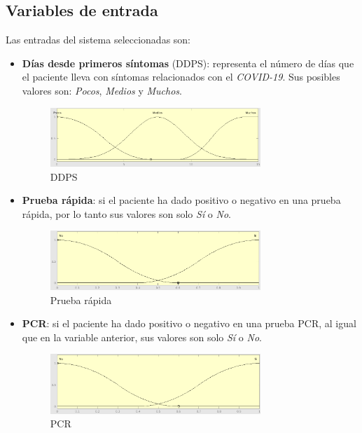 \documentclass[12pt,a4paper, xcolor=table]{article}
\begin{document}
\begin{center}
\subsection{Variables de entrada}

Las entradas del sistema seleccionadas son:

\begin{itemize}
  \item \textbf{Días desde primeros síntomas} (DDPS): representa el número de días que el paciente lleva con síntomas relacionados con el \textit{COVID-19}. Sus posibles valores son: \textit{Pocos}, \textit{Medios} y \textit{Muchos}.

  \begin{figure}[!h]
      \centering
      \includegraphics[width=300px]{img/dias_primeros_sintomas.png}
      \caption{DDPS}
  \end{figure}

  \item \textbf{Prueba rápida}: si el paciente ha dado positivo o negativo en una prueba rápida, por lo tanto sus valores son solo \textit{Sí} o \textit{No}.

  \begin{figure}[!h]
      \centering
      \includegraphics[width=300px]{img/prueba_rapida.png}
      \caption{Prueba rápida}
  \end{figure}

  \item \textbf{PCR}: si el paciente ha dado positivo o negativo en una prueba PCR, al igual que en la variable anterior, sus valores son solo \textit{Sí} o \textit{No}.

  \begin{figure}[!h]
      \centering
      \includegraphics[width=300px]{img/PCR.png}
      \caption{PCR}
  \end{figure}


\end{itemize}
\end{center}
\end{document}
